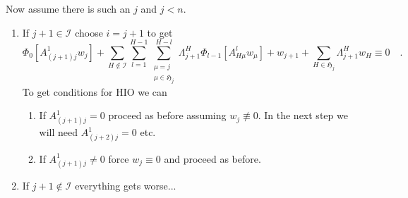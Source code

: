 %		


	Now assume there is such an $j$ and $j<n$. 
	\begin{enumerate}
		\item If $j+1 \in \mathcal{I}$ choose $i=j+1$ to get
		\begin{equation}
		\Phi_0\left[ A_{(j+1)j}^1 w_j \right]  + \sum\limits_{H\notin\mathcal{I}} \sum
		\limits_{l=1}^{H-1}
		\sum\limits_{\substack{\mu = j \\\mu\in\mathfrak{H}_j }}^{H-l} \Lambda_{j+1}^H 
		\Phi_{l-1}\left[ A^l_{H\mu} w_\mu \right]
		+w_{j+1} +
		\sum\limits_{ H\in\mathfrak{H}_j } \Lambda_{j+1}^H w_H \equiv 0 \quad .
		\end{equation} 
		To get conditions for HIO we can
		\begin{enumerate}
			\item If $A^1_{(j+1)j}=0$ proceed as before assuming $w_j\not\equiv 
			0$. In the next step we will need $A^1_{(j+2)j}=0$ etc.
			\item If $A^1_{(j+1)j}\neq0$ force $w_j \equiv 0$ and proceed as 
			before.
		\end{enumerate}
		\item If $j+1 \notin \mathcal{I}$ everything gets worse...
	\end{enumerate}

